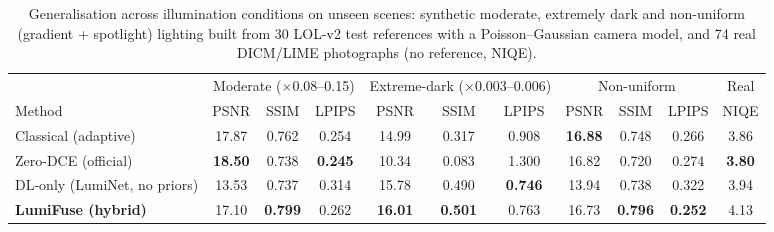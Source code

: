 \begin{table}[t]
\centering
\caption{Generalisation across illumination conditions on unseen scenes: synthetic moderate, extremely dark and non-uniform (gradient + spotlight) lighting built from 30 LOL-v2 test references with a Poisson--Gaussian camera model, and 74 real DICM/LIME photographs (no reference, NIQE).}
\label{tab:conditions}
\setlength{\tabcolsep}{5pt}
\begin{tabular}{l ccc ccc ccc c}
\toprule
 & \multicolumn{3}{c}{Moderate ($\times$0.08--0.15)} & \multicolumn{3}{c}{Extreme-dark ($\times$0.003--0.006)} & \multicolumn{3}{c}{Non-uniform} & Real \\
\cmidrule(lr){2-4}\cmidrule(lr){5-7}\cmidrule(lr){8-10}\cmidrule(lr){11-11}
Method & PSNR & SSIM & LPIPS & PSNR & SSIM & LPIPS & PSNR & SSIM & LPIPS & NIQE \\
\midrule
Classical (adaptive) & 17.87 & 0.762 & 0.254 & 14.99 & 0.317 & 0.908 & \textbf{16.88} & 0.748 & 0.266 & 3.86 \\
Zero-DCE (official) & \textbf{18.50} & 0.738 & \textbf{0.245} & 10.34 & 0.083 & 1.300 & 16.82 & 0.720 & 0.274 & \textbf{3.80} \\
DL-only (LumiNet, no priors) & 13.53 & 0.737 & 0.314 & 15.78 & 0.490 & \textbf{0.746} & 13.94 & 0.738 & 0.322 & 3.94 \\
\textbf{LumiFuse (hybrid)} & 17.10 & \textbf{0.799} & 0.262 & \textbf{16.01} & \textbf{0.501} & 0.763 & 16.73 & \textbf{0.796} & \textbf{0.252} & 4.13 \\
\bottomrule
\end{tabular}
\end{table}
